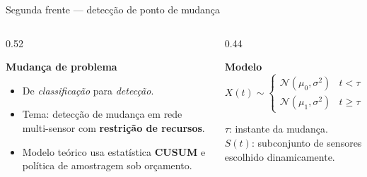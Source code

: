 \documentclass[aspectratio=169, 11pt]{beamer}
\begin{document}
\begin{frame}{Segunda frente --- detecção de ponto de mudança}

\begin{columns}[T]
\begin{column}{0.52\textwidth}

\textbf{Mudança de problema}
\begin{itemize}
  \item De \emph{classificação} para \emph{detecção}.
  \item Tema: detecção de mudança em rede multi-sensor com
        \textbf{restrição de recursos}.
  \item Modelo teórico usa estatística \textbf{CUSUM} e
        política de amostragem sob orçamento.
\end{itemize}

\end{column}
\begin{column}{0.44\textwidth}

\textbf{Modelo}
\[
  X(t) \sim
  \begin{cases}
    \mathcal{N}(\mu_0, \sigma^2) & t < \tau \\
    \mathcal{N}(\mu_1, \sigma^2) & t \geq \tau
  \end{cases}
\]

\vspace{0.3em}
\small
$\tau$: instante da mudança.\\
$S(t)$: subconjunto de sensores escolhido dinamicamente.

\end{column}
\end{columns}

\end{frame}
\end{document}
